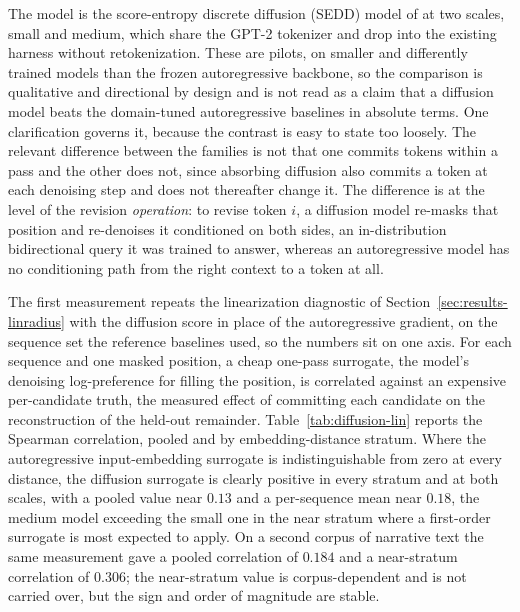 The model is the score-entropy discrete diffusion (SEDD) model of \citet{lou2024discrete} at two scales, small and medium, which share the GPT-2 tokenizer and drop into the existing harness without retokenization. These are pilots, on smaller and differently trained models than the frozen autoregressive backbone, so the comparison is qualitative and directional by design and is not read as a claim that a diffusion model beats the domain-tuned autoregressive baselines in absolute terms. One clarification governs it, because the contrast is easy to state too loosely. The relevant difference between the families is not that one commits tokens within a pass and the other does not, since absorbing diffusion also commits a token at each denoising step and does not thereafter change it. The difference is at the level of the revision \emph{operation}: to revise token $i$, a diffusion model re-masks that position and re-denoises it conditioned on both sides, an in-distribution bidirectional query it was trained to answer, whereas an autoregressive model has no conditioning path from the right context to a token at all.

The first measurement repeats the linearization diagnostic of Section~\ref{sec:results-linradius} with the diffusion score in place of the autoregressive gradient, on the sequence set the reference baselines used, so the numbers sit on one axis. For each sequence and one masked position, a cheap one-pass surrogate, the model's denoising log-preference for filling the position, is correlated against an expensive per-candidate truth, the measured effect of committing each candidate on the reconstruction of the held-out remainder. Table~\ref{tab:diffusion-lin} reports the Spearman correlation, pooled and by embedding-distance stratum. Where the autoregressive input-embedding surrogate is indistinguishable from zero at every distance, the diffusion surrogate is clearly positive in every stratum and at both scales, with a pooled value near $0.13$ and a per-sequence mean near $0.18$, the medium model exceeding the small one in the near stratum where a first-order surrogate is most expected to apply. On a second corpus of narrative text the same measurement gave a pooled correlation of $0.184$ and a near-stratum correlation of $0.306$; the near-stratum value is corpus-dependent and is not carried over, but the sign and order of magnitude are stable. %

